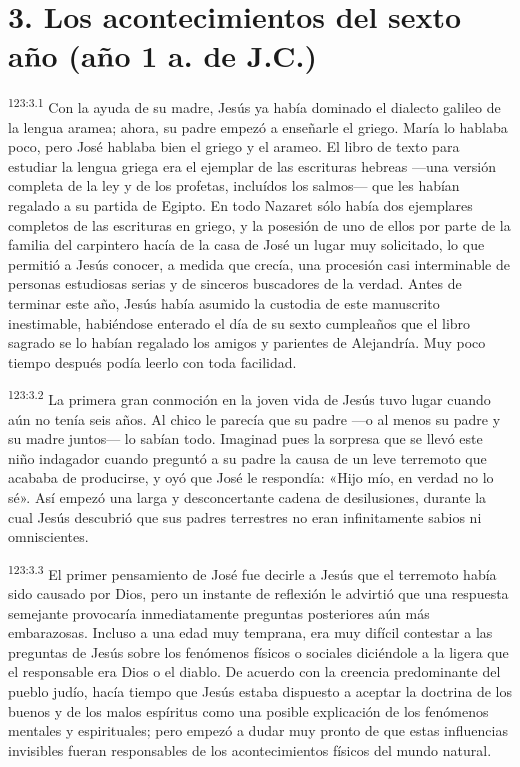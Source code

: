 \section*{3. Los acontecimientos del sexto año (año 1 a. de J.C.)}
\par 
\textsuperscript{123:3.1} Con la ayuda de su madre, Jesús ya había dominado el dialecto galileo de la lengua aramea; ahora, su padre empezó a enseñarle el griego. María lo hablaba poco, pero José hablaba bien el griego y el arameo. El libro de texto para estudiar la lengua griega era el ejemplar de las escrituras hebreas ---una versión completa de la ley y de los profetas, incluídos los salmos--- que les habían regalado a su partida de Egipto. En todo Nazaret sólo había dos ejemplares completos de las escrituras en griego, y la posesión de uno de ellos por parte de la familia del carpintero hacía de la casa de José un lugar muy solicitado, lo que permitió a Jesús conocer, a medida que crecía, una procesión casi interminable de personas estudiosas serias y de sinceros buscadores de la verdad. Antes de terminar este año, Jesús había asumido la custodia de este manuscrito inestimable, habiéndose enterado el día de su sexto cumpleaños que el libro sagrado se lo habían regalado los amigos y parientes de Alejandría. Muy poco tiempo después podía leerlo con toda facilidad.

\par 
\textsuperscript{123:3.2} La primera gran conmoción en la joven vida de Jesús tuvo lugar cuando aún no tenía seis años. Al chico le parecía que su padre ---o al menos su padre y su madre juntos--- lo sabían todo. Imaginad pues la sorpresa que se llevó este niño indagador cuando preguntó a su padre la causa de un leve terremoto que acababa de producirse, y oyó que José le respondía: «Hijo mío, en verdad no lo sé». Así empezó una larga y desconcertante cadena de desilusiones, durante la cual Jesús descubrió que sus padres terrestres no eran infinitamente sabios ni omniscientes.

\par 
\textsuperscript{123:3.3} El primer pensamiento de José fue decirle a Jesús que el terremoto había sido causado por Dios, pero un instante de reflexión le advirtió que una respuesta semejante provocaría inmediatamente preguntas posteriores aún más embarazosas. Incluso a una edad muy temprana, era muy difícil contestar a las preguntas de Jesús sobre los fenómenos físicos o sociales diciéndole a la ligera que el responsable era Dios o el diablo. De acuerdo con la creencia predominante del pueblo judío, hacía tiempo que Jesús estaba dispuesto a aceptar la doctrina de los buenos y de los malos espíritus como una posible explicación de los fenómenos mentales y espirituales; pero empezó a dudar muy pronto de que estas influencias invisibles fueran responsables de los acontecimientos físicos del mundo natural.

